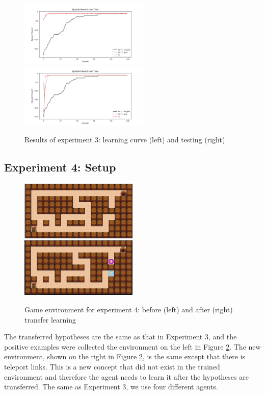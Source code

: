 \begin{figure}[!htb]
\centerline{
\includegraphics[width=0.55\textwidth]{./figures/experiment3_after_training}
\includegraphics[width=0.55\textwidth]{./figures/experiment3_after_test}
}
\caption{Results of experiment 3: learning curve (left) and testing (right)}
\label{experiment3_training}
\end{figure}


\subsection{Experiment 4: Setup}
\label{subsec:experiement4_setup}
\begin{figure}[!htb]
\centerline{
\includegraphics[width=0.5\textwidth]{./figures/experiment4_before}
\includegraphics[width=0.5\textwidth]{./figures/experiment4_after}}
\caption{Game environment for experiment 4: before (left) and after (right) transfer learning}
\label{experiment4_setup}
\end{figure}

The transferred hypotheses are the same as that in Experiment 3, and the positive examples were collected the environment on the left in Figure \ref{experiment4_setup}.
The new environment, shown on the right in Figure \ref{experiment4_setup}, is the same except that there is teleport links.
This is a new concept that did not exist in the trained environment and therefore the agent needs to learn it after the hypotheses are transferred.
The same as Experiment 3, we use four different agents.

